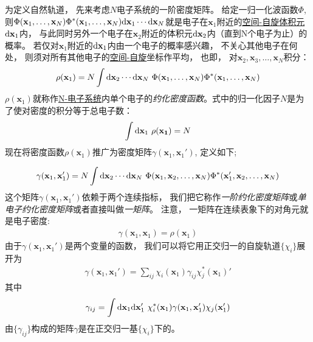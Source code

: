 为定义自然轨道，
先来考虑$N$电子系统的一阶密度矩阵。
给定一归一化波函数$\Phi$, 
则$\Phi(\mathbf{x}_1,\ldots,\mathbf{x}_N)\Phi^*(\mathbf{x}_1,\ldots,\mathbf{x}_N)\ddx_1\cdots\ddx_N$就是电子在$\mathbf{x}_1$附近的\underline{\underline{空间-自旋}体积元}$\ddx_1$内，
与此同时另外一个电子在$\mathbf{x}_2$附近的体积元$\ddx_2$内（直到N个电子为止）的概率。
若仅对$\mathbf{x}_1$附近的$\ddx_1$内由一个电子的概率感兴趣，
不关心其他电子在何处，
则须对所有其他电子的\underline{空间-自旋}坐标作平均，
也即，
对$\mathbf{x}_2,\mathbf{x}_3,\ldots,\mathbf{x}_N$积分：
\begin{align}
\rho(\mathbf{x}_1) = N \int\ddx_2\cdots\ddx_N \,\, \Phi(\mathbf{x}_1,\ldots,\mathbf{x}_N)\Phi^*(\mathbf{x}_1,\ldots,\mathbf{x}_N)
\end{align}
$\rho(\mathbf{x}_1)$就称作\underline{N-电子系统}内单个电子的\emph{约化密度函数}。式中的归一化因子$N$是为了使对密度的积分等于总电子数：
\begin{align}
\int\ddx_1\,\,\rho(\mathbf{x_1}) = N
\end{align}
现在将密度函数$\rho(\mathbf{x}_1)$推广为密度矩阵$\gamma(\mathbf{x}_1,\mathbf{x}_1')$, 
定义如下;

\begin{align}
\label{4.35}
\gamma(\mathbf{x}_1,\mathbf{x}_1') = N \int\ddx_2\cdots\ddx_N \,\, \Phi(\mathbf{x}_1,\mathbf{x}_2,\ldots,\mathbf{x}_N)\Phi^*(\mathbf{x}_1',\mathbf{x}_2,\ldots,\mathbf{x}_N)
\end{align}
这个矩阵$\gamma(\mathbf{x}_1,\mathbf{x}_1')$依赖于两个连续指标，
我们把它称作\emph{一阶约化密度矩阵}或\emph{单电子约化密度矩阵}或者直接叫做\emph{一矩阵}。
注意，
一矩阵在连续表象下的对角元就是电子密度:
\begin{align}
\gamma(\mathbf{x}_1,\mathbf{x}_1) = \rho(\mathbf{x}_1)
\end{align}
由于$\gamma(\mathbf{x}_1,\mathbf{x}_1')$是两个变量的函数，
我们可以将它用正交归一的\hft 自旋轨道$\{\chi_i\}$展开为
\begin{align}
\gamma(\mathbf{x}_1,\mathbf{x}_1') = \sum_{ij} \chi_i(\mathbf{x}_1) \gamma_{ij} \chi_j^*(\mathbf{x}_1)'
\label{4.37}
\end{align}
其中
\begin{align}
\gamma_{ij} = \int\ddx_1\ddx_1'\,\,\chi_i^*(\mathbf{x}_1)\gamma(\mathbf{x}_1,\mathbf{x}_1')\chi_j(\mathbf{x}_1')
\end{align}
由$\{\gamma_{ij}\}$构成的矩阵$\gamma$是在正交归一基$\{\chi_i\}$下的。


